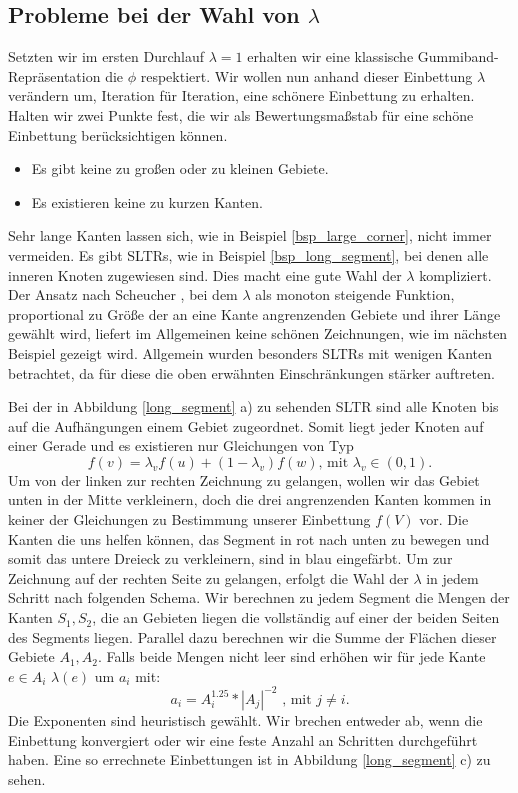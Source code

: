 \subsection{Probleme bei der Wahl von $\lambda$}

Setzten wir im ersten Durchlauf $\lambda = 1$ erhalten wir eine klassische Gummiband-Repräsentation die $\phi$ respektiert. Wir wollen nun anhand dieser Einbettung $\lambda$ verändern um, Iteration für Iteration, eine \glqq schönere\grqq{ } Einbettung zu erhalten. Halten wir zwei Punkte fest, die wir als Bewertungsmaßstab für eine schöne Einbettung berücksichtigen können.
\begin{itemize}
\item Es gibt keine zu großen oder zu kleinen Gebiete.
\item Es existieren keine zu kurzen Kanten.
\end{itemize}

Sehr lange Kanten lassen sich, wie in Beispiel \ref{bsp_large_corner}, nicht immer vermeiden. Es gibt SLTRs, wie in Beispiel \ref{bsp_long_segment}, bei denen alle inneren Knoten zugewiesen sind. Dies macht eine gute Wahl der $\lambda$ kompliziert. Der Ansatz nach Scheucher \cite{fs17}, bei dem $\lambda$ als monoton steigende Funktion, proportional zu Größe der an eine Kante angrenzenden Gebiete und ihrer Länge gewählt wird, liefert im Allgemeinen keine schönen Zeichnungen, wie im nächsten Beispiel gezeigt wird. Allgemein wurden besonders SLTRs mit wenigen Kanten betrachtet, da für diese die oben erwähnten Einschränkungen stärker auftreten.

\begin{example}\label{bsp_long_segment}
Bei der in Abbildung \ref{long_segment} a) zu sehenden SLTR sind alle Knoten bis auf die Aufhängungen einem Gebiet zugeordnet. Somit liegt jeder Knoten auf einer Gerade und es existieren nur Gleichungen von Typ
$$ f(v) = \lambda_v f(u) + (1-\lambda_v)f(w) \text{, mit } \lambda_v \in (0,1).$$
Um von der linken zur rechten Zeichnung zu gelangen, wollen wir das Gebiet unten in der Mitte verkleinern, doch die drei angrenzenden Kanten kommen in keiner der Gleichungen zu Bestimmung unserer Einbettung $f(V)$ vor. Die Kanten die uns helfen können, das Segment in rot nach unten zu bewegen und somit das untere Dreieck zu verkleinern, sind in blau eingefärbt. Um zur Zeichnung auf der rechten Seite zu gelangen, erfolgt die Wahl der $\lambda$ in jedem Schritt nach folgenden Schema. Wir berechnen zu jedem Segment die Mengen der Kanten $S_1,S_2$, die an Gebieten liegen die vollständig auf einer der beiden Seiten des Segments liegen. Parallel dazu berechnen wir die Summe der Flächen dieser Gebiete $A_1,A_2$. Falls beide Mengen nicht leer sind erhöhen wir für jede Kante $e \in A_i$ $\lambda(e)$ um $a_i$ mit:
$$ a_i = A_i^{1.25}*|A_j|^{-2} \text{ , mit } j \neq i.$$
Die Exponenten sind heuristisch gewählt. Wir brechen entweder ab, wenn die Einbettung konvergiert oder wir eine feste Anzahl an Schritten durchgeführt haben. Eine so errechnete Einbettungen ist in Abbildung \ref{long_segment} c) zu sehen.
\end{example}

